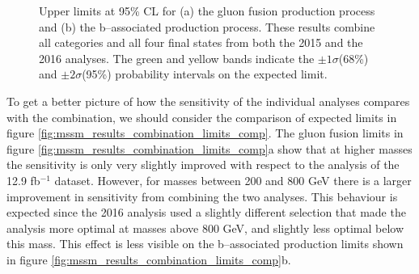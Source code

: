 \begin{figure}[h!]
\begin{center}
\end{center}
\caption[Upper limits at 95\% CL for the gluon fusion and b-associated production
process, obtained by combining all channels and categories of the 2015 nd the 2016 analyses.] {Upper limits at 95\% CL for (a) the gluon fusion production
process and (b) the b--associated production process. These results
combine all categories and all four final states from both the 2015
and the 2016 analyses. The green and yellow bands indicate
the $\pm 1\sigma$(68\%) and $\pm 2\sigma$(95\%) probability intervals on the expected limit.}
\label{fig:mssm_results_combination_limits}
\end{figure}

To get a better picture of how the sensitivity of the individual analyses compares
with the combination, we should consider the comparison
of expected limits in figure \ref{fig:mssm_results_combination_limits_comp}. The
gluon fusion limits in figure \ref{fig:mssm_results_combination_limits_comp}a show that at
higher masses the sensitivity is only very slightly improved with respect to the 
analysis of the 12.9 fb$^{-1}$ dataset. However, for masses between 200 and 800 GeV
there is a larger improvement in sensitivity from combining the two analyses.
This behaviour is expected since the 2016 analysis used a slightly different
selection that made the analysis more optimal at masses above 800 GeV,
and slightly less optimal below this mass. This
effect is less visible on the b--associated production limits shown in figure \ref{fig:mssm_results_combination_limits_comp}b.

